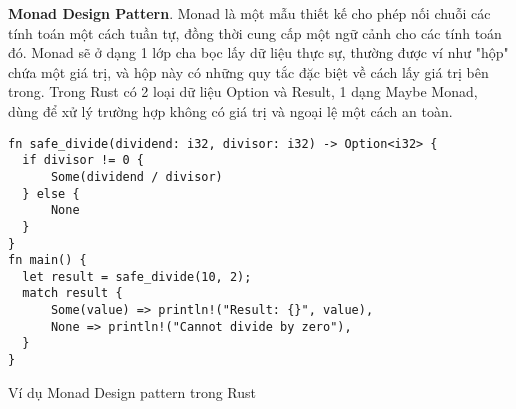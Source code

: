 

\textbf{Monad Design Pattern}. Monad là một mẫu thiết kế cho phép nối chuỗi các tính toán một cách tuần tự, đồng thời cung cấp một ngữ cảnh cho các tính toán đó.
Monad sẽ ở dạng 1 lớp cha bọc lấy dữ liệu thực sự, thường được ví như "hộp" chứa một giá trị, và hộp này có những quy tắc đặc biệt về cách lấy giá trị bên trong.
Trong Rust có 2 loại dữ liệu Option và Result, 1 dạng Maybe Monad, dùng để xử lý trường hợp không có giá trị và ngoại lệ một cách an toàn.

\begin{listing}[H]
\begin{verbatim}
fn safe_divide(dividend: i32, divisor: i32) -> Option<i32> {
  if divisor != 0 {
      Some(dividend / divisor)
  } else {
      None
  }
}
fn main() {
  let result = safe_divide(10, 2);
  match result {
      Some(value) => println!("Result: {}", value),
      None => println!("Cannot divide by zero"),
  }
}
\end{verbatim}
\caption{Ví dụ Monad Design pattern trong Rust}
\label{code:fp_monad}
\end{listing}



